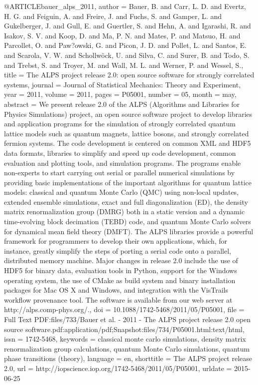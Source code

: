 @ARTICLE{bauer_alps_2011,
  author = {Bauer, B. and Carr, L. D. and Evertz, H. G. and Feiguin, A. and Freire,
	J. and Fuchs, S. and Gamper, L. and Gukelberger, J. and Gull, E.
	and Guertler, S. and Hehn, A. and Igarashi, R. and Isakov, S. V.
	and Koop, D. and Ma, P. N. and Mates, P. and Matsuo, H. and Parcollet,
	O. and Paw?owski, G. and Picon, J. D. and Pollet, L. and Santos,
	E. and Scarola, V. W. and Schollwöck, U. and Silva, C. and Surer,
	B. and Todo, S. and Trebst, S. and Troyer, M. and Wall, M. L. and
	Werner, P. and Wessel, S.},
  title = {The {ALPS} project release 2.0: open source software for strongly
	correlated systems},
  journal = {Journal of Statistical Mechanics: Theory and Experiment},
  year = {2011},
  volume = {2011},
  pages = {P05001},
  number = {05},
  month = may,
  abstract = {We present release 2.0 of the ALPS (Algorithms and Libraries for Physics
	Simulations) project, an open source software project to develop
	libraries and application programs for the simulation of strongly
	correlated quantum lattice models such as quantum magnets, lattice
	bosons, and strongly correlated fermion systems. The code development
	is centered on common XML and HDF5 data formats, libraries to simplify
	and speed up code development, common evaluation and plotting tools,
	and simulation programs. The programs enable non-experts to start
	carrying out serial or parallel numerical simulations by providing
	basic implementations of the important algorithms for quantum lattice
	models: classical and quantum Monte Carlo (QMC) using non-local updates,
	extended ensemble simulations, exact and full diagonalization (ED),
	the density matrix renormalization group (DMRG) both in a static
	version and a dynamic time-evolving block decimation (TEBD) code,
	and quantum Monte Carlo solvers for dynamical mean field theory (DMFT).
	The ALPS libraries provide a powerful framework for programmers to
	develop their own applications, which, for instance, greatly simplify
	the steps of porting a serial code onto a parallel, distributed memory
	machine. Major changes in release 2.0 include the use of HDF5 for
	binary data, evaluation tools in Python, support for the Windows
	operating system, the use of CMake as build system and binary installation
	packages for Mac OS X and Windows, and integration with the VisTrails
	workflow provenance tool. The software is available from our web
	server at http://alps.comp-phys.org/.},
  doi = {10.1088/1742-5468/2011/05/P05001},
  file = {Full Text PDF:files/733/Bauer et al. - 2011 - The ALPS project release 2.0 open source        software.pdf:application/pdf;Snapshot:files/734/P05001.html:text/html},
  issn = {1742-5468},
  keywords = {classical monte carlo simulations, density matrix renormalization
	group calculations, quantum Monte Carlo simulations, quantum phase
	transitions (theory)},
  language = {en},
  shorttitle = {The {ALPS} project release 2.0},
  url = {http://iopscience.iop.org/1742-5468/2011/05/P05001},
  urldate = {2015-06-25}
}

